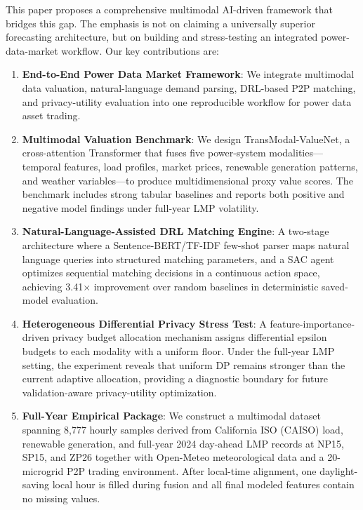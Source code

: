 \documentclass{ieeeaccess}
\begin{document}
This paper proposes a comprehensive multimodal AI-driven framework that bridges this gap. The emphasis is not on claiming a universally superior forecasting architecture, but on building and stress-testing an integrated power-data-market workflow. Our key contributions are:

\begin{enumerate}
  \item \textbf{End-to-End Power Data Market Framework}: We integrate multimodal data valuation, natural-language demand parsing, DRL-based P2P matching, and privacy-utility evaluation into one reproducible workflow for power data asset trading.

  \item \textbf{Multimodal Valuation Benchmark}: We design TransModal-ValueNet, a cross-attention Transformer that fuses five power-system modalities---temporal features, load profiles, market prices, renewable generation patterns, and weather variables---to produce multidimensional proxy value scores. The benchmark includes strong tabular baselines and reports both positive and negative model findings under full-year LMP volatility.

  \item \textbf{Natural-Language-Assisted DRL Matching Engine}: A two-stage architecture where a Sentence-BERT/TF-IDF few-shot parser maps natural language queries into structured matching parameters, and a SAC agent optimizes sequential matching decisions in a continuous action space, achieving 3.41$\times$ improvement over random baselines in deterministic saved-model evaluation.

  \item \textbf{Heterogeneous Differential Privacy Stress Test}: A feature-importance-driven privacy budget allocation mechanism assigns differential epsilon budgets to each modality with a uniform floor. Under the full-year LMP setting, the experiment reveals that uniform DP remains stronger than the current adaptive allocation, providing a diagnostic boundary for future validation-aware privacy-utility optimization.

  \item \textbf{Full-Year Empirical Package}: We construct a multimodal dataset spanning 8,777 hourly samples derived from California ISO (CAISO) load, renewable generation, and full-year 2024 day-ahead LMP records at NP15, SP15, and ZP26 together with Open-Meteo meteorological data and a 20-microgrid P2P trading environment. After local-time alignment, one daylight-saving local hour is filled during fusion and all final modeled features contain no missing values.
\end{enumerate}
\end{document}

